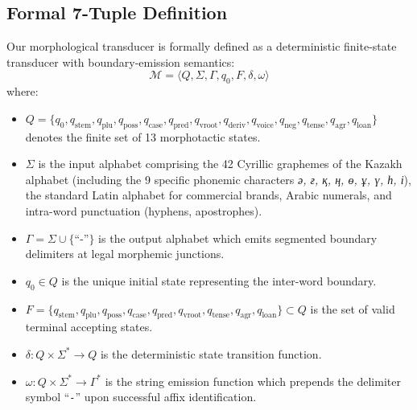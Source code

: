 \subsection{Formal 7-Tuple Definition}
Our morphological transducer is formally defined as a deterministic finite-state transducer with boundary-emission semantics:
\begin{equation}
\label{eq:app_fst_7tuple}
\mathcal{M} = \langle Q, \Sigma, \Gamma, q_0, F, \delta, \omega \rangle
\end{equation}
where:
\begin{itemize}
    \item $Q = \{q_0, q_{\text{stem}}, q_{\text{plu}}, q_{\text{poss}}, q_{\text{case}}, q_{\text{pred}}, q_{\text{vroot}}, q_{\text{deriv}}, q_{\text{voice}}, q_{\text{neg}}, q_{\text{tense}}, q_{\text{agr}}, q_{\text{loan}}\}$ denotes the finite set of 13 morphotactic states.
    \item $\Sigma$ is the input alphabet comprising the 42 Cyrillic graphemes of the Kazakh alphabet (including the 9 specific phonemic characters \textit{ә, ғ, қ, ң, ө, ұ, ү, һ, і}), the standard Latin alphabet for commercial brands, Arabic numerals, and intra-word punctuation (hyphens, apostrophes).
    \item $\Gamma = \Sigma \cup \{\text{``-''}\}$ is the output alphabet which emits segmented boundary delimiters at legal morphemic junctions.
    \item $q_0 \in Q$ is the unique initial state representing the inter-word boundary.
    \item $F = \{q_{\text{stem}}, q_{\text{plu}}, q_{\text{poss}}, q_{\text{case}}, q_{\text{pred}}, q_{\text{vroot}}, q_{\text{tense}}, q_{\text{agr}}, q_{\text{loan}}\} \subset Q$ is the set of valid terminal accepting states.
    \item $\delta: Q \times \Sigma^* \rightarrow Q$ is the deterministic state transition function.
    \item $\omega: Q \times \Sigma^* \rightarrow \Gamma^*$ is the string emission function which prepends the delimiter symbol ``\texttt{-}'' upon successful affix identification.
\end{itemize}

